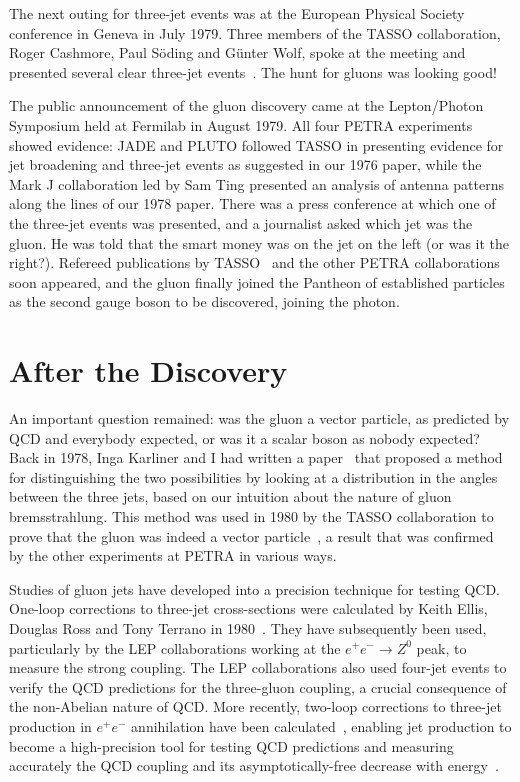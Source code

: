 \documentclass{ws-rv975x65}[12pt]
\begin{document}
The next outing for three-jet events was at the European Physical Society conference in Geneva in July 1979.
Three members of the TASSO collaboration, Roger Cashmore, Paul S{\"o}ding and G{\" u}nter Wolf,
spoke at the meeting and presented several clear three-jet events~\cite{TASSO}. The hunt for gluons was looking good!

The public announcement of the gluon discovery came at the Lepton/Photon Symposium held at Fermilab in August 1979.
All four PETRA experiments showed evidence: JADE and PLUTO followed TASSO in presenting evidence for jet 
broadening and three-jet events as suggested in our 1976 paper, while the Mark J collaboration led by Sam Ting
presented an analysis of antenna patterns along the lines of our 1978 paper.
There was a press conference at which one of the three-jet events was presented,
and a journalist asked which jet was the gluon. He was told that the smart money was on the jet on the left (or was it the right?). Refereed publications by TASSO~\cite{TASSO} and the other PETRA collaborations~\cite{PETRA} soon appeared,
and the gluon finally joined the Pantheon of established particles as the second gauge boson to be discovered,
joining the photon.

\section{After the Discovery}

An important question remained: was the gluon a vector particle, as predicted by QCD and everybody expected,
or was it a scalar boson as nobody expected? Back in 1978, Inga Karliner and I had written
a paper~\cite{EK} that proposed a method for distinguishing the two possibilities by looking at a distribution
in the angles between the three jets, based on our intuition about the nature of gluon bremsstrahlung.
This method was used in 1980 by the TASSO collaboration to prove that the gluon was indeed a vector particle~\cite{spin},
a result that was confirmed by the other experiments at PETRA in various ways.

Studies of gluon jets have developed into a precision technique for testing QCD.
One-loop corrections to three-jet cross-sections were calculated by Keith Ellis, Douglas Ross and Tony Terrano in 1980~\cite{ERT}.
They have subsequently been used, particularly by the LEP collaborations working at the $e^+ e^- \to Z^0$ peak,
to measure the strong coupling. The LEP collaborations also used four-jet events to verify the QCD predictions
for the three-gluon coupling, a crucial consequence of the non-Abelian nature of QCD.
More recently, two-loop corrections to three-jet production in $e^+ e^-$ annihilation
have been calculated~\cite{Glover}, enabling jet production to become a high-precision tool for
testing QCD predictions and measuring accurately the QCD coupling and its
asymptotically-free decrease with energy~\cite{PDG}.
\end{document}
